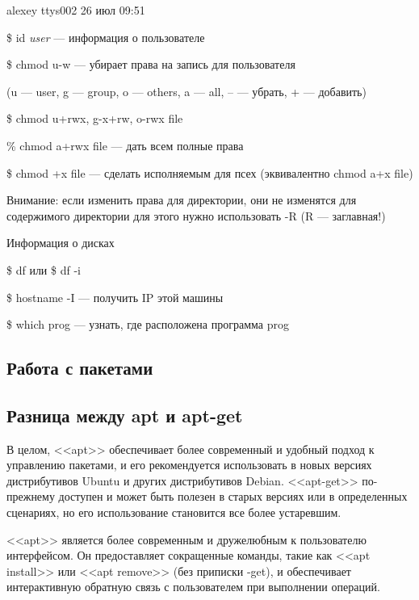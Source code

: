 \documentclass[oneside, final, 14pt]{extreport} %
\begin{document}
alexey           ttys002      26 июл 09:51 

\vspace{\baselineskip}


\$ id \textit{user} --- информация о пользователе

\$ chmod u-w --- убирает права на запись для пользователя

(u --- user, g --- group, o --- others, a --- all, \--- --- убрать, + --- добавить)

\$ chmod u+rwx, g-x+rw, o-rwx file

\% chmod a+rwx file --- дать всем полные права

\$ chmod +x file --- сделать исполняемым для псех (эквивалентно chmod a+x file)

Внимание: если изменить права для директории, они не изменятся для содержимого директории
для этого нужно использовать \--R (R --- заглавная!)

Информация о дисках

\$ df или \$ df -i

\vspace*{\baselineskip}

\$ hostname -I --- получить IP этой машины

\$ which prog --- узнать, где расположена программа prog

\vspace*{\baselineskip}


\subsection{Работа с пакетами}

\subsection*{Разница между apt и apt-get}
В целом, <<apt>> обеспечивает более современный и удобный подход к управлению пакетами, и его рекомендуется использовать в новых версиях дистрибутивов Ubuntu и других дистрибутивов Debian. <<apt-get>> по-прежнему доступен и может быть полезен в старых версиях или в определенных сценариях, но его использование становится все более устаревшим.

<<apt>> является более современным и дружелюбным к пользователю интерфейсом. Он предоставляет сокращенные команды, такие как <<apt install>> или <<apt remove>> (без приписки \--get), и обеспечивает интерактивную обратную связь с пользователем при выполнении операций.
\end{document}
